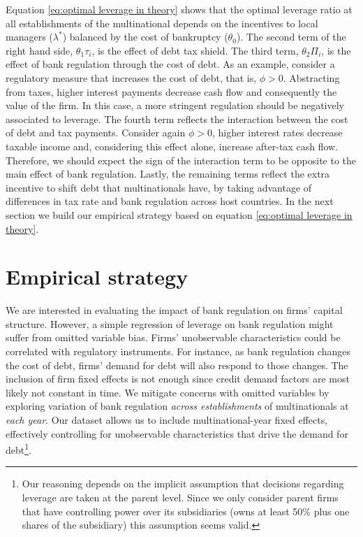 \documentclass[12pt]{article}
\begin{document}
    Equation \ref{eq:optimal leverage in theory} shows that the optimal leverage ratio at all establishments of the multinational depends on the incentives to local managers ($\lambda^*$) balanced by the cost of bankruptcy ($\theta_0$). The second term of the right hand side, $\theta_1\tau_i$, is the effect of debt tax shield. The third term, $\theta_2\Pi_i$, is the effect of bank regulation through the cost of debt. As an example, consider a regulatory measure that increases the cost of debt, that is, $\phi>0$. Abstracting from taxes, higher interest payments decrease cash flow and consequently the value of the firm. In this case, a more stringent regulation should be negatively associated to leverage. The fourth term reflects the interaction between the cost of debt and tax payments. Consider again $\phi>0$, higher interest rates decrease taxable income and, considering this effect alone, increase after-tax cash flow. Therefore, we should expect the sign of the interaction term to be opposite to the main effect of bank regulation. Lastly, the remaining terms reflect the extra incentive to shift debt that multinationals have, by taking advantage of differences in tax rate and bank regulation across host countries. In the next section we build our empirical strategy based on equation \ref{eq:optimal leverage in theory}.

    	\section{Empirical strategy}
    \label{sec:strategy}

    We are interested in evaluating the impact of bank regulation on firms' capital structure. However, a simple regression of leverage on bank regulation might suffer from omitted variable bias. Firms' unobservable characteristics could be correlated with regulatory instruments. For instance, as bank regulation changes the cost of debt, firms' demand for debt will also respond to those changes. The inclusion of firm fixed effects is not enough since credit demand factors are most likely not constant in time. We mitigate concerns with omitted variables by exploring variation of bank regulation \textit{across establishments} of multinationals at \textit{each year}. Our dataset allows us to include multinational-year fixed effects, effectively controlling for unobservable characteristics that drive the demand for debt\footnote{Our reasoning depends on the implicit assumption that decisions regarding leverage are taken at the parent level. Since we only consider parent firms that have controlling power over its subsidiaries (owns at least 50\% plus one shares of the subsidiary) this assumption seems valid.}.
\end{document}
